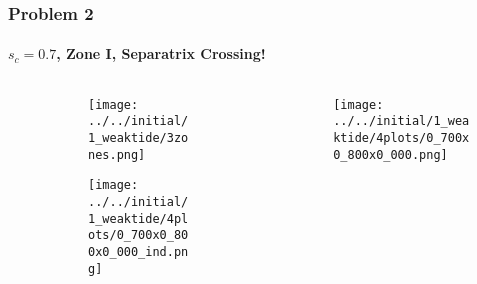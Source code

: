 \documentclass[dvipsnames, 11pt]{beamer}
\begin{document}
\begin{frame}
    \frametitle{Problem 2}
    \framesubtitle{$s_c = 0.7$, Zone I, Separatrix Crossing!}

    \begin{columns}
        \begin{column}{0.5\textwidth}
            \begin{figure}
                \centering
                \begin{subfigure}{\columnwidth}
                    \centering
                    \texttt{[image: ../../initial/1\_weaktide/3zones.png]}
                \end{subfigure}

                \begin{subfigure}{\columnwidth}
                    \centering
                    \texttt{[image: ../../initial/1\_weaktide/4plots/0\_700x0\_800x0\_000\_ind.png]}
                \end{subfigure}
            \end{figure}
        \end{column}
        \begin{column}{0.5\textwidth}
            \begin{figure}[t]
                \centering
                \texttt{[image: ../../initial/1\_weaktide/4plots/0\_700x0\_800x0\_000.png]}
            \end{figure}
        \end{column}
    \end{columns}
\end{frame}
\end{document}
